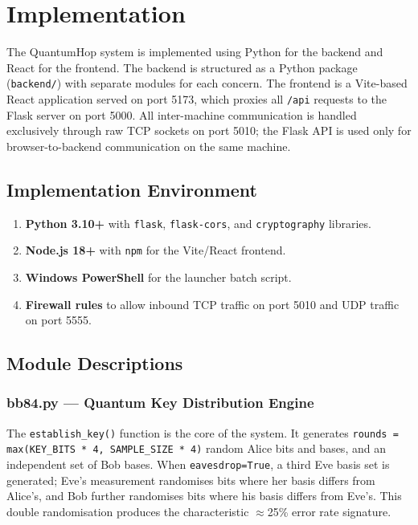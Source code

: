 \chapter{Implementation}

The QuantumHop system is implemented using Python for the backend and React for the frontend. The backend is structured as a Python package (\texttt{backend/}) with separate modules for each concern. The frontend is a Vite-based React application served on port 5173, which proxies all \texttt{/api} requests to the Flask server on port 5000. All inter-machine communication is handled exclusively through raw TCP sockets on port 5010; the Flask API is used only for browser-to-backend communication on the same machine.

\section{Implementation Environment}

\begin{enumerate}
    \item \textbf{Python 3.10+} with \texttt{flask}, \texttt{flask-cors}, and \texttt{cryptography} libraries.
    \item \textbf{Node.js 18+} with \texttt{npm} for the Vite/React frontend.
    \item \textbf{Windows PowerShell} for the launcher batch script.
    \item \textbf{Firewall rules} to allow inbound TCP traffic on port 5010 and UDP traffic on port 5555.
\end{enumerate}

\section{Module Descriptions}

\subsection{bb84.py --- Quantum Key Distribution Engine}

The \texttt{establish\_key()} function is the core of the system. It generates \texttt{rounds = max(KEY\_BITS * 4, SAMPLE\_SIZE * 4)} random Alice bits and bases, and an independent set of Bob bases. When \texttt{eavesdrop=True}, a third Eve basis set is generated; Eve's measurement randomises bits where her basis differs from Alice's, and Bob further randomises bits where his basis differs from Eve's. This double randomisation produces the characteristic $\approx$25\% error rate signature.

